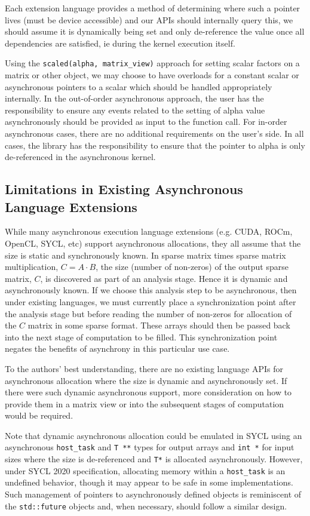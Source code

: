 Each extension language provides a method of determining where such a pointer lives (must be device accessible) and our APIs should internally query this, we should assume it is dynamically being set and only de-reference the value once all dependencies are satisfied, ie during the kernel execution itself. 

Using the \verb|scaled(alpha, matrix_view)| approach for setting scalar factors on a matrix or other object, we may choose to have overloads for a constant scalar or asynchronous pointers to a scalar which should be handled appropriately internally.  In the out-of-order asynchronous approach, the user has the responsibility to ensure any events related to the setting of alpha value asynchronously should be provided as input to the function call.  For in-order asynchronous cases, there are no additional requirements on the user's side.  In all cases, the library has the responsibility to ensure that the pointer to alpha is only de-referenced in the asynchronous kernel.

\subsection{Limitations in Existing Asynchronous Language Extensions}

While many asynchronous execution language extensions (e.g. CUDA, ROCm, OpenCL, SYCL, etc) support asynchronous allocations, they all assume that the size is static and synchronously known.  In sparse matrix times sparse matrix multiplication, $C = A \cdot B$, the size (number of non-zeros) of the output sparse matrix, $C$, is discovered as part of an analysis stage. Hence it is dynamic and asynchronously known.  If we choose this analysis step to be asynchronous, then under existing languages, we must currently place a synchronization point after the analysis stage but before reading the number of non-zeros for allocation of the $C$ matrix in some sparse format. These arrays should then be passed back into the next stage of computation to be filled. This synchronization point negates the benefits of asynchrony in this particular use case.

To the authors' best understanding, there are no existing language APIs for asynchronous allocation where the size is dynamic and asynchronously set. If there were such dynamic asynchronous support, more consideration on how to provide them in a matrix view or into the subsequent stages of computation would be required.

Note that dynamic asynchronous allocation could be emulated in SYCL using an asynchronous \verb|host_task| and \verb|T **| types for output arrays and \verb|int *| for input sizes where the size is de-referenced and \verb|T*| is allocated asynchronously. However, under SYCL 2020 specification, allocating memory within a \verb|host_task| is an undefined behavior, though it may appear to be safe in some implementations. Such management of pointers to asynchronously defined objects is reminiscent of the \verb|std::future| objects and, when necessary, should follow a similar design.
\fi